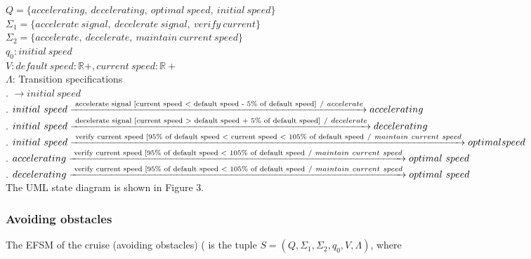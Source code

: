 \documentclass[12pt]{article}
\begin{document}
\begin{spacing}{1.5}
\noindent $Q = \{accelerating,~decelerating,~optimal~speed,~initial ~speed\}$\\
\noindent $\Sigma_1 = \{accelerate~signal,~decelerate~signal,~ verify~current\}$\\
\noindent $\Sigma_2 = \{accelerate,~decelerate,~maintain~current~speed\}$\\
\noindent $q_0: initial~speed$\\
\noindent $V: default~speed: \mathbb R+, current~speed: \mathbb R+$\\
\noindent $\Lambda$: Transition specifications\\
. $\rightarrow initial~speed$\\
. $initial~speed \xrightarrow {\text { accelerate signal [current speed \textless~default speed - 5\% of default speed]}~/ ~accelerate} accelerating$\\
. $initial~speed \xrightarrow {\text { decelerate signal [current speed \textgreater~default speed + 5\% of default speed]}~/ ~decelerate} decelerating$\\
. $initial~speed \xrightarrow {\text { verify current speed [95\% of default speed \textless~current speed \textless~105\% of default speed}~/~maintain~current~speed} optimal speed$\\
. $accelerating \xrightarrow {\text { verify current speed [95\% of default speed \textless~105\% of default speed}~/~maintain~current~speed} optimal~speed$\\
. $decelerating \xrightarrow {\text { verify current speed [95\% of default speed \textless~105\% of default speed}~/~maintain~current~speed} optimal~speed$\\


\noindent The UML state diagram is shown in Figure 3.

\newpage

\subsubsection{Avoiding obstacles}

\noindent The EFSM of the cruise (avoiding obstacles) ( is the tuple $S = (Q, \Sigma_1, \Sigma_2, q_0, V, \Lambda)$, where\\


\end{spacing}
\end{document}
